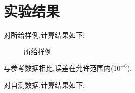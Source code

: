 \documentclass[12pt,a4paper,oneside]{article}
\begin{document}
\section{实验结果}
对所给样例,计算结果如下:
\begin{figure}[H]
    \centering
    \hspace{0.5in}
    \caption{所给样例}
\end{figure}\noindent
与参考数据相比,误差在允许范围内($10^{-6}$).\par
对自测数据,计算结果如下:
\end{document}
